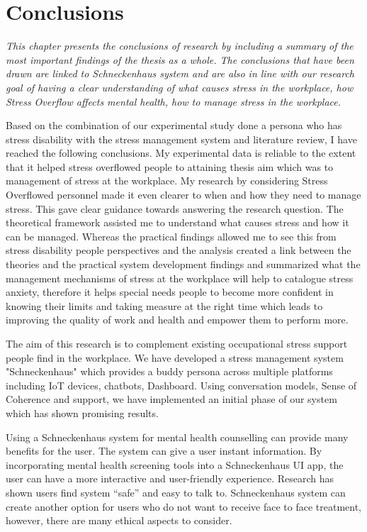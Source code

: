 \chapter{Conclusions}
\textit{This chapter presents the conclusions of research by including a summary of the most important findings of the thesis as a whole. The conclusions that have been drawn are linked to Schneckenhaus system and are also in line with our research goal of having a clear understanding of what causes stress in the workplace, how Stress Overflow affects mental health, how to manage stress in the workplace.}
\vspace{5mm}

Based on the combination of our experimental study done a persona who has stress disability with the stress management system and literature review, I have reached the following conclusions. My experimental data is reliable to the extent that it helped stress overflowed people to attaining thesis aim which was to management of stress at the workplace. My research by considering  Stress Overflowed personnel made it even clearer to when and how they need to manage stress. This gave clear guidance towards answering the research question. The theoretical framework assisted me to understand what causes stress and how it can be managed. Whereas the practical findings allowed me to see this from stress disability people perspectives and the analysis created a link between the theories and the practical system development findings and summarized what the management mechanisms of stress at the workplace will help to catalogue stress anxiety, therefore it helps special needs people to become more confident in knowing their limits and taking measure at the right time which leads to improving the quality of work and health and empower them to perform more.

The aim of this research is to complement existing occupational stress support people find in the workplace. We have developed a stress management system "Schneckenhaus" which provides a buddy persona across multiple platforms including IoT devices, chatbots, Dashboard. Using conversation models, Sense of Coherence and support, we have implemented an initial phase of our system which has shown promising results.

Using a Schneckenhaus system for mental health counselling can provide many benefits for the user. The system can give a user instant information. By incorporating mental health screening tools into a Schneckenhaus \acf{UI} app, the user can have a more interactive and user-friendly experience. Research has shown users find system “safe” and easy to talk to. Schneckenhaus system can create another option for users who do not want to receive face to face treatment, however, there are many ethical aspects to consider.
 
